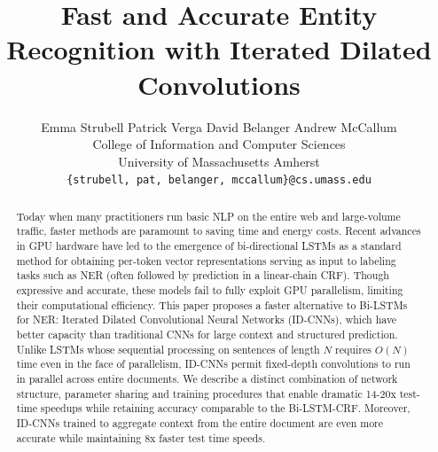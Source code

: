 \documentclass[11pt,letterpaper]{article}
\title{Fast and Accurate Entity Recognition with Iterated Dilated Convolutions}
\author{Emma Strubell \qquad Patrick Verga \qquad David Belanger \qquad Andrew McCallum\\
  College of Information and Computer Sciences \\
  University of Massachusetts Amherst \\
  {\tt \{strubell, pat, belanger, mccallum\}@cs.umass.edu}
}
\date{}
\begin{document}
\maketitle
\begin{abstract}

Today when many practitioners run basic NLP on the entire web and large-volume traffic, faster methods are paramount to saving time and energy costs.
Recent advances in GPU hardware have led to the emergence of bi-directional LSTMs as a standard method for obtaining per-token vector representations serving as input to labeling tasks such as NER (often followed by prediction in a linear-chain CRF). 
Though expressive and accurate, these models fail to fully exploit GPU parallelism, limiting their computational efficiency.
This paper proposes a faster alternative to Bi-LSTMs for NER: Iterated Dilated Convolutional Neural Networks (ID-CNNs), which have better capacity than traditional CNNs for large context and structured prediction.  
Unlike LSTMs whose sequential processing on sentences of length $N$ requires $O(N)$ time even in the face of parallelism, ID-CNNs permit fixed-depth convolutions to run in parallel across entire documents.
We describe a distinct combination of network structure, parameter sharing and training procedures that enable dramatic 14-20x test-time speedups while retaining accuracy comparable to the Bi-LSTM-CRF. Moreover, ID-CNNs trained to aggregate context from the entire document are even more accurate while maintaining 8x faster test time speeds.




\end{abstract}
\end{document}
